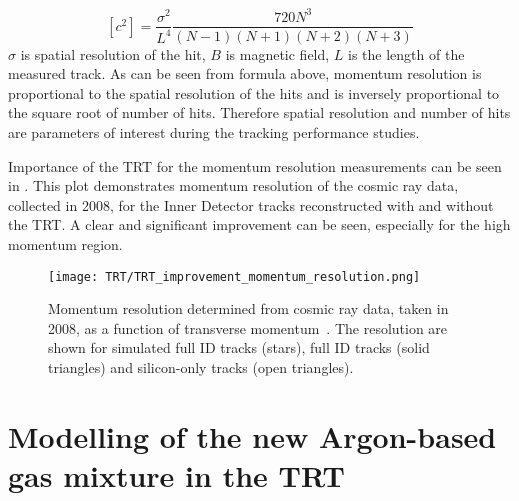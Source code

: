 \begin{equation}
[c^2] = \dfrac{\sigma^2}{L^4}\dfrac{720 N^3}{(N-1)(N+1)(N+2)(N+3)}
\end{equation}
$\sigma$ is spatial resolution of the hit, $B$ is magnetic field, $L$ is the length of the measured track.
As can be seen from formula above, momentum resolution is proportional to the spatial resolution of the hits and is inversely proportional to the square root of 
number of hits. Therefore spatial resolution and number of hits are parameters of interest during the tracking performance studies.

Importance of the TRT for the momentum resolution measurements can be seen in .
This plot demonstrates momentum resolution of the cosmic ray data, collected in 2008, for the Inner Detector tracks reconstructed with and without the TRT.
A clear and significant improvement can be seen, especially for the high momentum region.


\begin{figure}
\centering
\texttt{[image: TRT/TRT\_improvement\_momentum\_resolution.png]}
\caption{ 
Momentum resolution determined from cosmic ray data, taken in 2008, as a function of transverse momentum~\cite{Aad:2010bx}.
The resolution are shown for simulated full ID tracks (stars), full ID tracks (solid triangles) and silicon-only tracks (open triangles).
}
\label{fig:improvement_of_momentum_resolution}
\end{figure}



\section{Modelling of the new Argon-based gas mixture in the TRT}
\label{sec:digi_argon}

